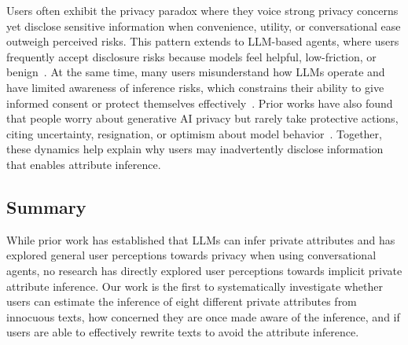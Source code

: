 Users often exhibit the privacy paradox where they voice strong privacy concerns yet disclose sensitive information when convenience, utility, or conversational ease outweigh perceived risks. This pattern extends to LLM-based agents, where users frequently accept disclosure risks because models feel helpful, low-friction, or benign~\cite{zhang2024s, mildner2024listening}. At the same time, many users misunderstand how LLMs operate and have limited awareness of inference risks, which constrains their ability to give informed consent or protect themselves effectively~\cite{DSIT2024PublicAttitudes, kimbel2024security, zhang2024s, rescriber, chen2025speculating}. Prior works have also found that people worry about generative AI privacy but rarely take protective actions, citing uncertainty, resignation, or optimism about model behavior~\cite{malki2025hoovered, kwesi2025exploringusersecurityprivacy}. Together, these dynamics help explain why users may inadvertently disclose information that enables attribute inference.


\subsection{Summary}
While prior work has established that LLMs can infer private attributes and has explored general user perceptions towards privacy when using conversational agents, no research has directly explored user perceptions towards implicit private attribute inference. Our work is the first to systematically investigate whether users can estimate the inference of eight different private attributes from innocuous texts, how concerned they are once made aware of the inference, and if users are able to effectively rewrite texts to avoid the attribute inference. 
